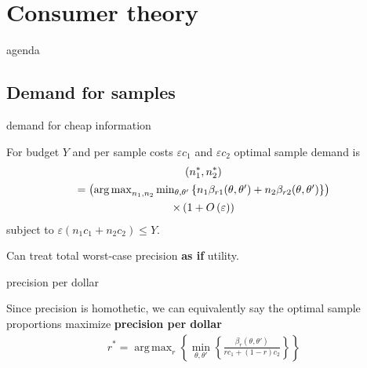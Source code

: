 \documentclass[square,]{gBakerBeamer}
\renewcommand{\|}{\,|\,}
\DeclareMathOperator*{\argmax}{arg\,max}
\begin{document}
\section{Consumer theory}
\label{sec:consumer-theory}


\begin{frame}{agenda}

  \tableofcontents[currentsection,sectionstyle=show/shaded]

  \note{%

  }
\end{frame}





\subsection{Demand for samples}
\label{sec:demand}


\begin{frame}{demand for cheap information}

  \begin{proposition}
    For budget $Y$ and per sample costs $\varepsilon c_1$ and $\varepsilon c_2$ optimal sample demand is
    \begin{multline*}
      (n_1^{*},n_2^{*}) \\
      =
      \mbox{\normalsize$\left(
          \argmax_{n_1,n_2} \min_{\theta,\theta'}
          \left\{ n_1 \beta_{r1}(\theta,\theta') + n_2 \beta_{r2}(\theta,\theta') \right\}
        \right)$}\\
      \mbox{\normalsize $\times\left(
          1 + O \left( \varepsilon \right)
        \right)$}
    \end{multline*}
    subject to $\varepsilon(n_1c_1+n_2c_2)\leq Y$.
  \end{proposition}\pause\bigskip

  Can treat total worst-case precision \textbf{as if} utility.

  \note{%

  }
\end{frame}


\begin{frame}{precision per dollar}

  Since precision is homothetic, we can equivalently say the optimal sample proportions maximize \textbf{precision per dollar}
  \begin{align*}
    r^{*} = \argmax_r \left\{ \min_{\theta,\theta'} \left\{
    \frac{\beta_r(\theta,\theta')}{rc_1+(1-r)c_2}
    \right\} \right\}
  \end{align*}

  \note{%

  }
\end{frame}
\end{document}
